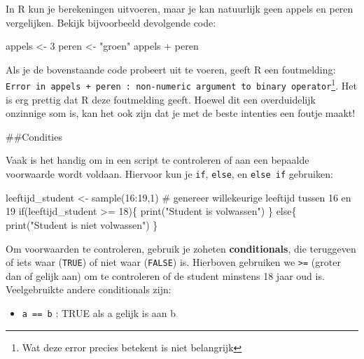 \documentclass[
  a4paper,
]{scrbook}
\newenvironment{Shaded}{\begin{snugshade}}{\end{snugshade}}
\newcommand{\CommentTok}[1]{\textcolor[rgb]{0.37,0.37,0.37}{#1}}
\newcommand{\ControlFlowTok}[1]{\textcolor[rgb]{0.00,0.23,0.31}{#1}}
\newcommand{\DecValTok}[1]{\textcolor[rgb]{0.68,0.00,0.00}{#1}}
\newcommand{\FunctionTok}[1]{\textcolor[rgb]{0.28,0.35,0.67}{#1}}
\newcommand{\NormalTok}[1]{\textcolor[rgb]{0.00,0.23,0.31}{#1}}
\newcommand{\OtherTok}[1]{\textcolor[rgb]{0.00,0.23,0.31}{#1}}
\newcommand{\SpecialCharTok}[1]{\textcolor[rgb]{0.37,0.37,0.37}{#1}}
\newcommand{\StringTok}[1]{\textcolor[rgb]{0.13,0.47,0.30}{#1}}
\providecommand{\tightlist}{%
  \setlength{\itemsep}{0pt}\setlength{\parskip}{0pt}}\usepackage{longtable,booktabs,array}
\theoremstyle{definition}
\theoremstyle{remark}
\begin{document}
In R kun je berekeningen uitvoeren, maar je kan natuurlijk geen appels
en peren vergelijken. Bekijk bijvoorbeeld devolgende code:

\begin{Shaded}
\begin{Highlighting}[]
\NormalTok{appels }\OtherTok{\textless{}{-}} \DecValTok{3}
\NormalTok{peren }\OtherTok{\textless{}{-}} \StringTok{"groen"}
\NormalTok{appels }\SpecialCharTok{+}\NormalTok{ peren}
\end{Highlighting}
\end{Shaded}

Als je de bovenstaande code probeert uit te voeren, geeft R een
foutmelding:
\texttt{Error\ in\ appels\ +\ peren\ :\ non-numeric\ argument\ to\ binary\ operator}\footnote{Wat
  deze error precies betekent is niet belangrijk}. Het is erg prettig
dat R deze foutmelding geeft. Hoewel dit een overduidelijk onzinnige som
is, kan het ook zijn dat je met de beste intenties een foutje maakt!

\#\#Condities

Vaak is het handig om in een script te controleren of aan een bepaalde
voorwaarde wordt voldaan. Hiervoor kun je \texttt{if}, \texttt{else}, en
\texttt{else\ if} gebruiken:

\begin{Shaded}
\begin{Highlighting}[]
\NormalTok{leeftijd\_student }\OtherTok{\textless{}{-}} \FunctionTok{sample}\NormalTok{(}\DecValTok{16}\SpecialCharTok{:}\DecValTok{19}\NormalTok{,}\DecValTok{1}\NormalTok{) }\CommentTok{\# genereer willekeurige leeftijd tussen 16 en 19}
\ControlFlowTok{if}\NormalTok{(leeftijd\_student }\SpecialCharTok{\textgreater{}=} \DecValTok{18}\NormalTok{)\{}
  \FunctionTok{print}\NormalTok{(}\StringTok{"Student is volwassen"}\NormalTok{)}
\NormalTok{\} }\ControlFlowTok{else}\NormalTok{\{}
  \FunctionTok{print}\NormalTok{(}\StringTok{"Student is niet volwassen"}\NormalTok{)}
\NormalTok{\}}
\end{Highlighting}
\end{Shaded}

Om voorwaarden te controleren, gebruik je zoheten \textbf{conditionals},
die teruggeven of iets waar (\texttt{TRUE}) of niet waar
(\texttt{FALSE}) is. Hierboven gebruiken we \texttt{\textgreater{}=}
(groter dan of gelijk aan) om te controleren of de student minstens 18
jaar oud is. Veelgebruikte andere conditionals zijn:

\begin{itemize}
\tightlist
\item
  \texttt{a\ ==\ b} : TRUE als a gelijk is aan b
\end{itemize}
\end{document}
